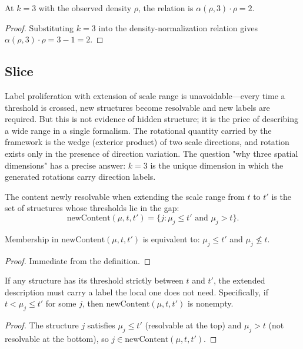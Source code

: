 \begin{theorem}
At $k = 3$ with the observed density $\rho$, the relation is $\alpha(\rho, 3) \cdot \rho = 2$.
\end{theorem}
\begin{proof}
Substituting $k = 3$ into the density-normalization relation gives $\alpha(\rho, 3) \cdot \rho = 3 - 1 = 2$.
\end{proof}

\subsection{Slice}

Label proliferation with extension of scale range is unavoidable—every time a threshold is crossed,
new structures become resolvable and new labels are required. But this is not evidence of hidden structure;
it is the price of describing a wide range in a single formalism. The rotational quantity carried by the framework
is the wedge (exterior product) of two scale directions, and rotation exists only in the presence of
direction variation. The question "why three spatial dimensions" has a precise answer: $k = 3$ is the unique
dimension in which the generated rotations carry direction labels.

\begin{definition}
The content newly resolvable when extending the scale range from $t$ to $t'$ is the set of structures
whose thresholds lie in the gap:
\[\text{newContent}(\mu, t, t') = \{j : \mu_j \leq t' \text{ and } \mu_j > t\}.\]
\end{definition}

\begin{theorem}
Membership in $\text{newContent}(\mu, t, t')$ is equivalent to: $\mu_j \leq t'$ and $\mu_j \not\leq t$.
\end{theorem}
\begin{proof}
Immediate from the definition.
\end{proof}

\begin{theorem}
If any structure has its threshold strictly between $t$ and $t'$, the extended description must carry
a label the local one does not need. Specifically, if $t < \mu_j \leq t'$ for some $j$, then
$\text{newContent}(\mu, t, t')$ is nonempty.
\end{theorem}
\begin{proof}
The structure $j$ satisfies $\mu_j \leq t'$ (resolvable at the top) and $\mu_j > t$ (not resolvable at the bottom),
so $j \in \text{newContent}(\mu, t, t')$.
\end{proof}

